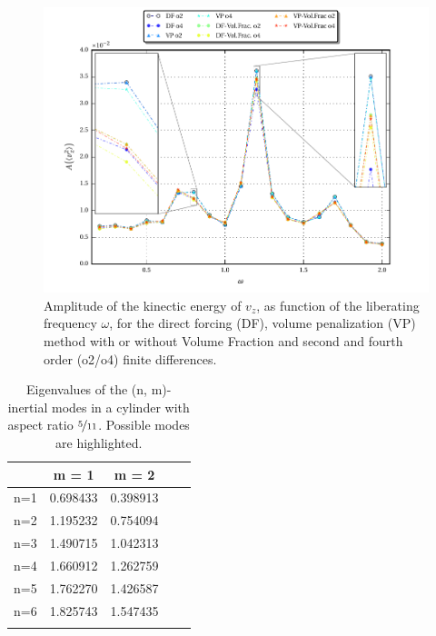 \clearpage

\begin{figure}[!t]
  \centering
  \includegraphics{gfx/cone/cylinder/cylinder.pdf}  \caption{\label{fig:cone:cyl}
    Amplitude of the kinectic energy of $v_z$, as function of the liberating frequency $\omega$,
   for the direct forcing (DF), volume penalization (VP) method with or without Volume Fraction and
      second and fourth order (o2/o4) finite differences.}
\end{figure}

\bgroup\large
\begin{table}[!b]
\centering
\def\arraystretch{1.5}%
\begin{tabular}{c c c c c}\toprule
            &    m =  1  & m = 2   &    \\ \hline
\midrule
        n=1 &   0.698433         &              0.398913 &    \\
        n=2 & \cellcolor{blue!25}  1.195232         &        \cellcolor{blue!25}      0.754094 &    \\
        n=3 &   1.490715         &              1.042313 &    \\
        n=4 &  \cellcolor{blue!25} 1.660912         &     \cellcolor{blue!25}         1.262759 &    \\
        n=5 &   1.762270         &              1.426587 &    \\
        n=6 &   1.825743         &              1.547435 &    \\ \hline

\bottomrule
\label{cone_cyleigenvalues}
\end{tabular}
\caption{Eigenvalues of the (n, m)-inertial modes in  a cylinder with aspect ratio $\nicefrac{5}{11}$.
            Possible modes are highlighted.}
\end{table}
\egroup
\clearpage

